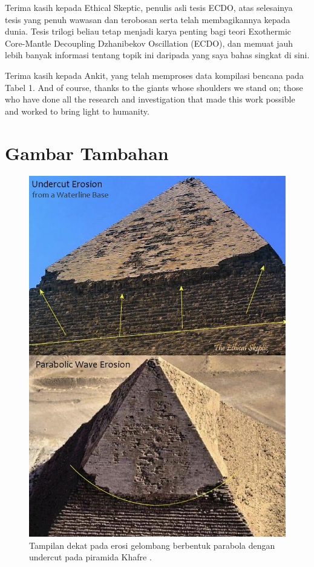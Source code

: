 \documentclass[10pt,twocolumn,letterpaper]{article}
\begin{document}
Terima kasih kepada Ethical Skeptic, penulis asli tesis ECDO, atas selesainya tesis yang penuh wawasan dan terobosan serta telah membagikannya kepada dunia. Tesis trilogi beliau \cite{1} tetap menjadi karya penting bagi teori Exothermic Core-Mantle Decoupling Dzhanibekov Oscillation (ECDO), dan memuat jauh lebih banyak informasi tentang topik ini daripada yang saya bahas singkat di sini.

Terima kasih kepada Ankit, yang telah memproses data kompilasi bencana pada Tabel 1.
And of course, thanks to the giants whose shoulders we stand on; those who have done all the research and investigation that made this work possible and worked to bring light to humanity.

\clearpage
\twocolumn

\section{Gambar Tambahan}


\begin{figure}[H]
\begin{center}
   \includegraphics[width=1\linewidth]{wave.jpg}
\end{center}
   \caption{Tampilan dekat pada erosi gelombang berbentuk parabola dengan undercut pada piramida Khafre \cite{27}.}
\label{fig:19}
\label{fig:onecol}
\end{figure}
\end{document}
